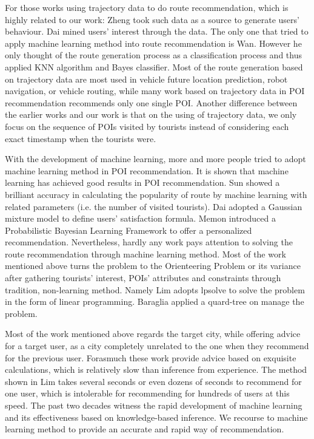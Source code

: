\documentclass[runningheads]{llncs}
\begin{document}
For those works using trajectory data to do route recommendation, which is highly related to our work: Zheng\cite{Zheng:2009:MIL:1526709.1526816} took such data as a source to generate users' behaviour. Dai\cite{7113313} mined users' interest through the data.  The only one that tried to apply machine learning method into route recommendation is Wan\cite{doi:10.1080/13658816.2018.1458988}. However he only thought of the route generation process as a classification process and thus applied KNN algorithm and Bayes classifier. Most of the route generation based on trajectory data are most used in vehicle future location prediction\cite{10.1007/978-3-319-91452-7_45}, robot navigation, or vehicle routing\cite{8509321}, while many work based on trajectory data in POI recommendation recommends only one single POI\cite{10.1007/978-3-642-35236-2_20}. Another difference between the earlier works and our work is that on the using of trajectory data, we only focus on the sequence of POIs visited by tourists instead of considering each exact timestamp when the tourists were.

With the development of machine learning, more and more people tried to adopt machine learning method in POI recommendation. It is shown that machine learning has achieved good results in POI recommendation. Sun\cite{sun2015road} showed a brilliant accuracy in calculating the popularity of route by machine learning with related parameters (i.e. the number of visited tourists). Dai\cite{7113313} adopted a Gaussian mixture model to define users' satisfaction formula. Memon\cite{memon2015travel} introduced a Probabilistic Bayesian Learning Framework to offer a personalized recommendation. Nevertheless, hardly any work pays attention to solving the route recommendation through machine learning method. Most of the work mentioned above turns the problem to the Orienteering Problem or its variance after gathering tourists' interest, POIs' attributes and constraints through tradition, non-learning method. Namely Lim\cite{lim2015personalized} adopts lpsolve to solve the problem in the form of linear programming. Baraglia\cite{10.1007/978-3-642-35236-2_20} applied a quard-tree on manage the problem.

Most of the work mentioned above regards the target city, while offering advice for a target user, as a city completely unrelated to the one when they recommend for the previous user. Forasmuch these work provide advice based on exquisite calculations, which is relatively slow than inference from experience. The method shown in Lim\cite{lim2015personalized} takes several seconds or even dozens of seconds to recommend for one user, which is intolerable for recommending for hundreds of users at this speed. The past two decades witness the rapid development of machine learning and its effectiveness based on knowledge-based inference. We recourse to machine learning method to provide an accurate and rapid way of recommendation. 
\end{document}
